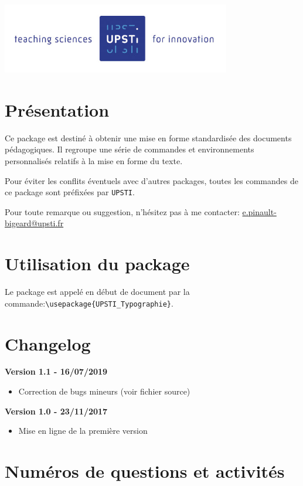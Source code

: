\documentclass[11pt]{ltxdockit}[2010/09/26]
\begin{document}
\printtitlepage

\begin{center}
	\includegraphics[width=10cm]{Images/logoUPSTI.jpg}
\end{center}

\tableofcontents

\section{Présentation}
Ce package est destiné à obtenir une mise en forme standardisée des documents pédagogiques. Il regroupe une série de commandes et environnements personnalisés relatifs à la mise en forme du texte.

Pour éviter les conflits éventuels avec d'autres packages, toutes les commandes de ce package sont préfixées par \verb!UPSTI!.

Pour toute remarque ou suggestion, n'hésitez pas à me contacter: \href{mailto:e.pinault-bigeard@upsti.fr}{e.pinault-bigeard@upsti.fr}

\section{Utilisation du package}
Le package est appelé en début de document par la commande:\linebreak \verb!\usepackage{UPSTI_Typographie}!. 

\section{Changelog}

\noindent\textbf{Version 1.1 - 16/07/2019}
\begin{itemize}
\item Correction de bugs mineurs (voir fichier source)
\end{itemize}
\noindent\textbf{Version 1.0 - 23/11/2017}
\begin{itemize}
\item Mise en ligne de la première version
\end{itemize}

\section{Numéros de questions et activités}
\end{document}
